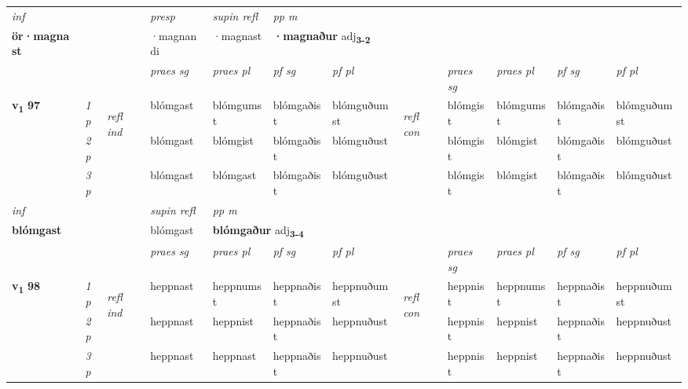 \begin{longtable}[l]{X>{\footnotesize\itshape}llXXXXlXXXX}
   {\textit{inf}} & &     & \textit{presp}  & \textit{supin refl} & \textit{pp m} \\*
  {\textbf{ör\allowbreak ·magnast}} & &     & ·magnandi  & ·magnast & \multicolumn{2}{l}{\textbf{·magnaður} adj\textbf{\textsubscript{3-2}}} \\*

\midrule

 & &   & \textit{praes sg}  & \textit{praes pl}    & \textit{ pf sg} & \textit{pf pl} & & \textit{praes sg}  & \textit{praes pl}    & \textit{pf sg} & \textit{pf pl }  \\ \cmidrule{4-7} \cmidrule{9-12}
 \multirow{2}{*}{{{\textbf{v{\textsubscript{1}}} \Large{\textbf{97}}}}}  & 1p & \multirow{3}{*}{\begin{turn}{90}\textit{refl ind}\end{turn}}  & blómgast & blómgumst & blómgaðist & blómguðumst & \multirow{3}{*}{\begin{turn}{90}\textit{refl con}\end{turn}}  &blómgist & blómgumst & blómgaðist & blómguðumst \\*
 & 2p &  & blómgast & blómgist & blómgaðist & blómguðust & &blómgist & blómgist & blómgaðist & blómguðust \\*
 & 3p  & & blómgast & blómgast & blómgaðist & blómguðust & & blómgist & blómgist& blómgaðist & blómguðust \\*
\cmidrule{4-7} \cmidrule{9-12}

   {\textit{inf}} & &       & \textit{supin refl} & \textit{pp m} \\*
  {\textbf{blómgast}} & &       & blómgast & \multicolumn{2}{l}{\textbf{blómgaður} adj\textbf{\textsubscript{3-4}}} \\*

\midrule

 & &   & \textit{praes sg}  & \textit{praes pl}    & \textit{ pf sg} & \textit{pf pl} & & \textit{praes sg}  & \textit{praes pl}    & \textit{pf sg} & \textit{pf pl }  \\ \cmidrule{4-7} \cmidrule{9-12}
 \multirow{2}{*}{{{\textbf{v{\textsubscript{1}}} \Large{\textbf{98}}}}}  & 1p & \multirow{3}{*}{\begin{turn}{90}\textit{refl ind}\end{turn}}  & heppnast & heppnumst & heppnaðist & heppnuðumst & \multirow{3}{*}{\begin{turn}{90}\textit{refl con}\end{turn}}  &heppnist & heppnumst & heppnaðist & heppnuðumst \\*
 & 2p &  & heppnast & heppnist & heppnaðist & heppnuðust & &heppnist & heppnist & heppnaðist & heppnuðust \\*
 & 3p  & & heppnast & heppnast & heppnaðist & heppnuðust & & heppnist & heppnist& heppnaðist & heppnuðust \\*
\cmidrule{4-7} \cmidrule{9-12}


\end{longtable}

